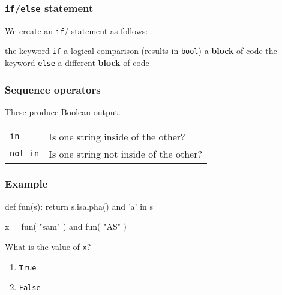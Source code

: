 \documentclass[11pt]{beamer}
\begin{document}
\begin{frame}[fragile]
  \frametitle{\texttt{if}/\texttt{else} statement}
  \Enlarge

  \begin{itemize}
  \myitem  We create an \texttt{if}/ statement as follows:
    \begin{itemize}
    \mysubitem  the keyword \texttt{if}
    \mysubitem  a logical comparison (results in \texttt{bool})
    \mysubitem  a \textbf{block} of code
    \mysubitem  the keyword \texttt{else}
    \mysubitem  a different \textbf{block} of code
    \end{itemize}
  \end{itemize}
\end{frame}

\begin{frame}[fragile]
  \frametitle{Sequence operators}
  \Enlarge

  \begin{itemize}
  \myitem  These produce Boolean output.
    \begin{tabular}{ll}
    \texttt{in}     & Is one string inside of the other? \\
    \texttt{not in} & Is one string not inside of the other?
    \end{tabular}
  \end{itemize}
\end{frame}

\begin{frame}[fragile]
  \frametitle{Example}
  \Enlarge

  \begin{semiverbatim}
def fun(s):
    return s.isalpha() and 'a' in s

x = fun( "sam" ) and fun( "AS" )
  \end{semiverbatim}
  What is the value of \texttt{x}?
  \begin{enumerate}[label=\Alph*]
  \item  \texttt{True}
  \item  \texttt{False} %
  \end{enumerate}
\end{frame}
\end{document}
